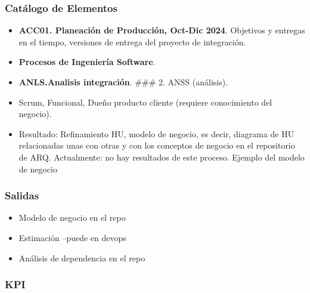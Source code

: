 \documentclass[
  paper=a4,
  ,captions=tableheading
]{scrartcl}
\providecommand{\tightlist}{%
  \setlength{\itemsep}{0pt}\setlength{\parskip}{0pt}}
\begin{document}
\subsubsection{Catálogo de
Elementos}\label{sec:catuxe1logo-de-elementos}

\begin{itemize}
\item
  \textbf{ACC01. Planeación de Producción, Oct-Dic 2024}. Objetivos y
  entregas en el tiempo, versiones de entrega del proyecto de
  integración.
\item
  \textbf{Procesos de Ingeniería Software}.
\item
  \textbf{ANLS.Analisis integración}. \#\#\# 2. ANSS (análisis).
\item
  Scrum, Funcional, Dueño producto cliente (requiere conocimiento del
  negocio).
\item
  Resultado: Refinamiento HU, modelo de negocio, es decir, diagrama de
  HU relacionadas unas con otras y con los conceptos de negocio en el
  repositorio de ARQ. Actualmente: no hay resultados de este proceso.
  Ejemplo del modelo de negocio
\end{itemize}

\subsubsection{Salidas}\label{sec:salidas}

\begin{itemize}
\tightlist
\item
  Modelo de negocio en el repo
\item
  Estimación --puede en devops
\item
  Análisis de dependencia en el repo
\end{itemize}

\subsubsection{KPI}\label{sec:kpi}
\end{document}
